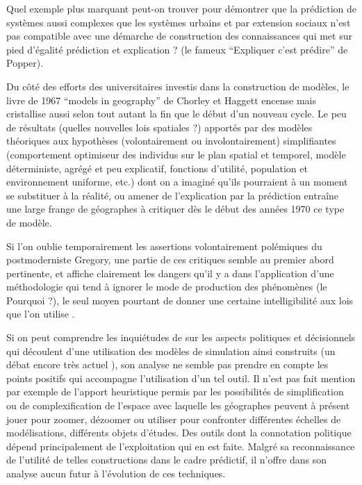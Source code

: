 Quel exemple plus marquant peut-on trouver pour démontrer que la prédiction de systèmes aussi complexes que les systèmes urbains et par extension sociaux n'est pas compatible avec une démarche de construction des connaissances qui met sur pied d'égalité prédiction et explication ? (le fameux \enquote{Expliquer c'est prédire} de Popper).

Du côté des efforts des universitaires investis dans la construction de modèles, le livre de 1967 \foreignquote{english}{models in geography} de Chorley et Haggett encense mais cristallise aussi selon \textcite{Golledge2006} tout autant la fin que le début d'un nouveau cycle. Le peu de résultats (quelles nouvelles lois spatiales ?) apportés par des modèles théoriques aux hypothèses (volontairement ou involontairement) simplifiantes (comportement optimiseur des individus sur le plan spatial et temporel, modèle déterministe, agrégé et peu explicatif, fonctions d'utilité, population et environnement uniforme, etc.) dont on a imaginé qu'ils pourraient à un moment se substituer à la réalité, ou amener de l'explication par la prédiction \autocite[41]{Gregory1978} entraîne une large frange de géographes à critiquer dès le début des années 1970 ce type de modèle.

Si l'on oublie temporairement les assertions volontairement polémiques du postmoderniste Gregory, une partie de ces critiques semble au premier abord pertinente, et affiche clairement les dangers qu'il y a dans l'application d'une méthodologie qui tend à ignorer le mode de production des phénomènes (le Pourquoi ?), le seul moyen pourtant de donner une certaine intelligibilité aux lois que l'on utilise \autocite[14-15]{Besse2000}. 


Si on peut comprendre les inquiétudes de \textcite{Gregory1978} sur les aspects politiques et décisionnels qui découlent d'une utilisation des modèles de simulation ainsi construits (un débat encore très actuel \autocite{OSullivan2004}), son analyse ne semble pas prendre en compte les points positifs qui accompagne l'utilisation d'un tel outil. Il n'est pas fait mention par exemple de l'apport heuristique permis par les possibilités de simplification ou de complexification de l'espace avec laquelle les géographes peuvent à présent jouer pour zoomer, dézoomer ou utiliser pour confronter différentes échelles de modélisations, différents objets d'études. Des outils dont la connotation politique dépend principalement de l'exploitation qui en est faite. Malgré sa reconnaissance de l'utilité de telles constructions dans le cadre prédictif, il n'offre dans son analyse aucun futur à l'évolution de ces techniques.

